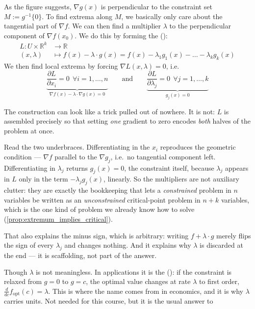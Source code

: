 As the figure suggests, $\nabla g(x)$ is perpendicular to the constraint set $M := g^{-1}\{0\}$. To find extrema along $M$, we basically only care about the tangential part of $\nabla f$. We can then find a multiplier $\lambda$ to  the perpendicular component of $\nabla f(x_0)$. We do this by forming the 
():
\[
\begin{aligned}
L : U \times \mathbb{R}^k &\to \mathbb{R} \\
(x,\lambda) &\mapsto f(x) - \lambda\cdot g(x) = f(x) - \lambda_1g_1(x) - \dots - \lambda_kg_k(x)
\end{aligned}
\]
We then find local extrema by forcing $\nabla L(x,\lambda) = 0$, i.e.
\[\underbrace{\frac{\partial L}{\partial x_i} = 0 \ \ \forall i = 1,\dots,n}_{\nabla f(x) - \lambda\cdot\nabla g(x) = 0} \qquad \text{and} \qquad \underbrace{\frac{\partial L}{\partial \lambda_j} = 0 \ \ \forall j = 1,\dots,k}_{g_j(x) = 0}\]

\begin{remark}
\label{rem:why_the_lagrangian}
The construction can look like a trick pulled out of nowhere. It is not: $L$ is assembled
precisely so that setting \emph{one} gradient to zero encodes \emph{both} halves of the problem
at once.

Read the two underbraces. Differentiating in the $x_i$ reproduces the geometric condition ---
$\nabla f$ parallel to the $\nabla g_j$, i.e.\ no tangential component left. Differentiating in
$\lambda_j$ returns $g_j(x)=0$, the constraint itself, because $\lambda_j$ appears in $L$ only
in the term $-\lambda_jg_j(x)$, linearly. So the multipliers are not auxiliary clutter: they are
exactly the bookkeeping that lets a \emph{constrained} problem in $n$ variables be written as an
\emph{unconstrained} critical-point problem in $n+k$ variables, which is the one kind of problem
we already know how to solve (\cref{prop:extremum_implies_critical}).

That also explains the minus sign, which is arbitrary: writing $f + \lambda\cdot g$ merely flips
the sign of every $\lambda_j$ and changes nothing. And it explains why $\lambda$ is discarded at
the end --- it is scaffolding, not part of the answer.

\begin{ainote}
Though $\lambda$ is not meaningless. In applications it is the 
(): if the constraint is relaxed from $g=0$ to $g=c$, the optimal value
changes at rate $\lambda$ to first order, $\tfrac{d}{dc}f_{\text{opt}}(c) = \lambda$. This is
where the name comes from in economics, and it is why $\lambda$ carries units. Not needed for
this course, but it is the usual answer to 
\end{ainote}
\end{remark}

